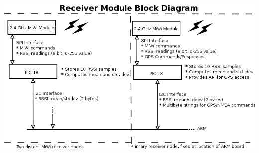 \documentclass{article}
\begin{document}
\includegraphics[width=1.1\textwidth]{receiver} \newline
\end{document}
